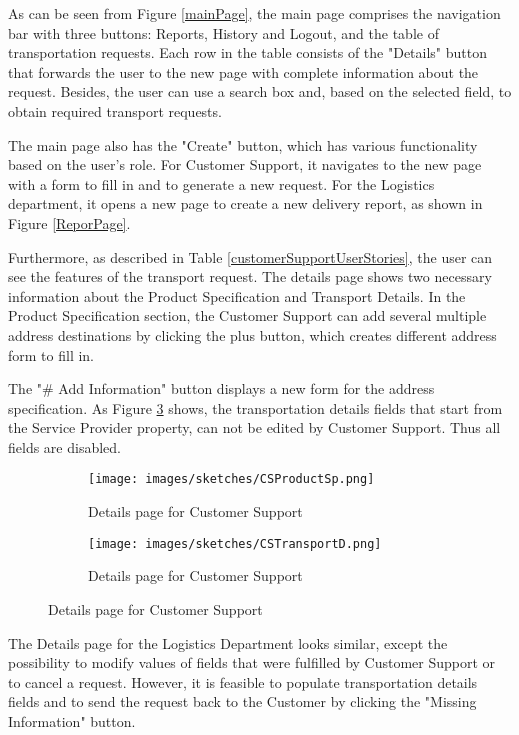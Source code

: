 \documentclass[a4paper]{article}
\begin{document}
    As can be seen from Figure \ref{mainPage}, the main page comprises the navigation bar with three buttons: Reports, History and Logout, and the table of transportation requests. Each row in the table consists of the "Details" button that forwards the user to the new page with complete information about the request. Besides, the user can use a search box and, based on the selected field, to obtain required transport requests.
    
    The main page also has the "Create" button, which has various functionality based on the user's role. For Customer Support, it navigates to the new page with a form to fill in and to generate a new request. For the Logistics department, it opens a new page to create a new delivery report, as shown in Figure \ref{ReporPage}. 
    
    Furthermore, as described in Table \ref{customerSupportUserStories}, the user can see the features of the transport request. The details page shows two necessary information about the Product Specification and Transport Details. In the Product Specification section, the Customer Support can add several multiple address destinations by clicking the plus button, which creates different address form to fill in.
    
    The "\# Add Information" button displays a new form for the address specification. As Figure \ref{CSDetailsTransportReq} shows, the transportation details fields that start from the Service Provider property, can not be edited by Customer Support. Thus all fields are disabled.
    
     \begin{figure}[H]
        \centering %
        \begin{subfigure}{0.5\textwidth}
        \texttt{[image: images/sketches/CSProductSp.png]}
        \caption{ Details page for Customer Support}
        \label{CSDetailsProductSp}
    \end{subfigure}\hfil %
    \begin{subfigure}{0.5\textwidth}
        \texttt{[image: images/sketches/CSTransportD.png]}
        \caption{Details page for Customer Support}
    \label{CSDetailsTransportReq}
    \end{subfigure}\hfil %
    \end{figure}
    
   The Details page for the Logistics Department looks similar, except the possibility to modify values of fields that were fulfilled by Customer Support or to cancel a request. However, it is feasible to populate transportation details fields and to send the request back to the Customer by clicking the "Missing Information" button.
    
\end{document}
